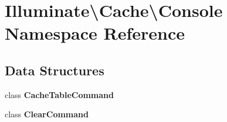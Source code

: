 \section{Illuminate\textbackslash{}Cache\textbackslash{}Console Namespace Reference}
\label{namespace_illuminate_1_1_cache_1_1_console}
\subsection*{Data Structures}
\begin{DoxyCompactItemize}
\item 
class {\bf Cache\+Table\+Command}
\item 
class {\bf Clear\+Command}
\end{DoxyCompactItemize}
